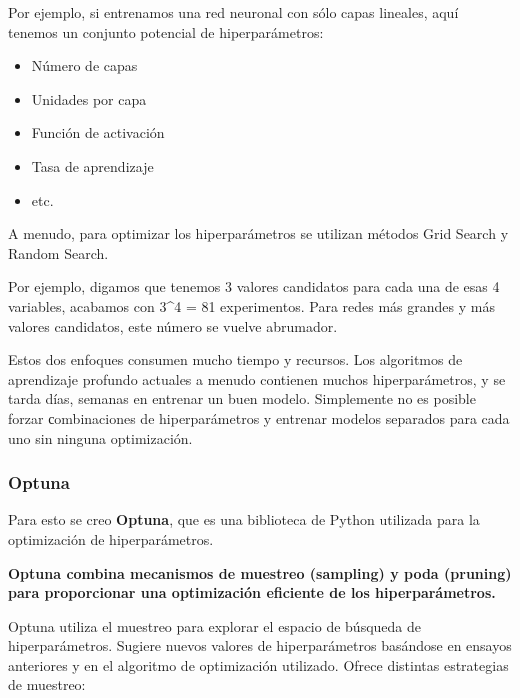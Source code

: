 \documentclass[11pt]{article}
\providecommand{\tightlist}{%
      \setlength{\itemsep}{0pt}\setlength{\parskip}{0pt}}
\begin{document}
Por ejemplo, si entrenamos una red neuronal con sólo capas lineales,
aquí tenemos un conjunto potencial de hiperparámetros:

    \begin{itemize}
\tightlist
\item
  Número de capas
\item
  Unidades por capa
\item
  Función de activación
\item
  Tasa de aprendizaje
\item
  etc.
\end{itemize}

    A menudo, para optimizar los hiperparámetros se utilizan métodos Grid
Search y Random Search.

    Por ejemplo, digamos que tenemos 3 valores candidatos para cada una de
esas 4 variables, acabamos con 3\^{}4 = 81 experimentos. Para redes más
grandes y más valores candidatos, este número se vuelve abrumador.

    Estos dos enfoques consumen mucho tiempo y recursos. Los algoritmos de
aprendizaje profundo actuales a menudo contienen muchos hiperparámetros,
y se tarda días, semanas en entrenar un buen modelo. Simplemente no es
posible forzar сombinaciones de hiperparámetros y entrenar modelos
separados para cada uno sin ninguna optimización.

    \hypertarget{optuna}{%
\subsubsection{Optuna}\label{optuna}}

    Para esto se creo \textbf{Optuna}, que es una biblioteca de Python
utilizada para la optimización de hiperparámetros.

    \textbf{Optuna combina mecanismos de muestreo (sampling) y poda
(pruning) para proporcionar una optimización eficiente de los
hiperparámetros.}

    Optuna utiliza el muestreo para explorar el espacio de búsqueda de
hiperparámetros. Sugiere nuevos valores de hiperparámetros basándose en
ensayos anteriores y en el algoritmo de optimización utilizado. Ofrece
distintas estrategias de muestreo:
\end{document}

